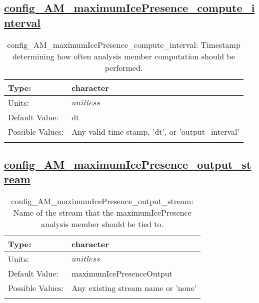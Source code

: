 \subsection[config\_AM\_maximumIcePresence\_compute\_interval]{\hyperref[sec:nm_tab_AM_maximumIcePresence]{config\_AM\_maximumIcePresence\_compute\_interval}}
\label{subsec:nm_sec_config_AM_maximumIcePresence_compute_interval}
\begin{center}
\begin{longtable}{| p{2.0in} || p{4.0in} |}
    \hline
    Type: & character \\
    \hline
    Units: & $unitless$ \\
    \hline
    Default Value: & dt \\
    \hline
    Possible Values: & Any valid time stamp, 'dt', or 'output\_interval' \\
    \hline
    \caption{config\_AM\_maximumIcePresence\_compute\_interval: Timestamp determining how often analysis member computation should be performed.}
\end{longtable}
\end{center}
\subsection[config\_AM\_maximumIcePresence\_output\_stream]{\hyperref[sec:nm_tab_AM_maximumIcePresence]{config\_AM\_maximumIcePresence\_output\_stream}}
\label{subsec:nm_sec_config_AM_maximumIcePresence_output_stream}
\begin{center}
\begin{longtable}{| p{2.0in} || p{4.0in} |}
    \hline
    Type: & character \\
    \hline
    Units: & $unitless$ \\
    \hline
    Default Value: & maximumIcePresenceOutput \\
    \hline
    Possible Values: & Any existing stream name or 'none' \\
    \hline
    \caption{config\_AM\_maximumIcePresence\_output\_stream: Name of the stream that the maximumIcePresence analysis member should be tied to.}
\end{longtable}
\end{center}
